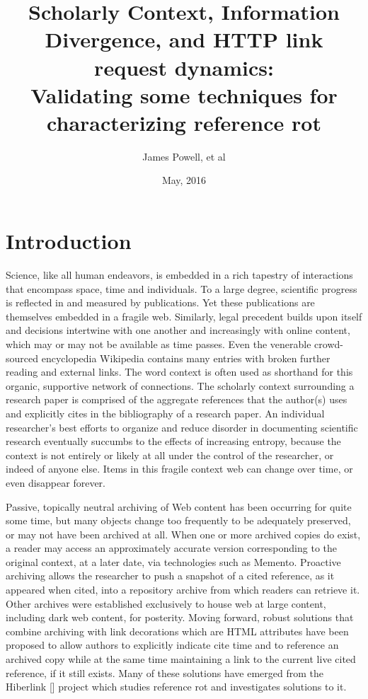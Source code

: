 \documentclass[12pt]{article}
\title{Scholarly Context, Information Divergence, and HTTP link request dynamics:\\
Validating some techniques for characterizing reference rot}
\date{May, 2016}
\author{James Powell, et al}
\begin{document}
\maketitle
\begin{abstract}
\end{abstract}
\section{Introduction}
Science, like all human endeavors, is embedded in a rich tapestry of interactions that encompass space, time and individuals. To a large degree, scientific progress is reflected in and measured by publications. Yet these publications are themselves embedded in a fragile web. Similarly, legal precedent builds upon itself and decisions intertwine with one another and increasingly with online content, which may or may not be available as time passes. Even the venerable crowd-sourced encyclopedia Wikipedia contains many entries with broken further reading and external links. The word context is often used as shorthand for this organic, supportive network of connections. The scholarly context surrounding a research paper is comprised of the aggregate references that the author(s) uses and explicitly cites in the bibliography of a research paper. An individual researcher's best efforts to organize and reduce disorder in documenting scientific research eventually succumbs to the effects of increasing entropy, because the context is not entirely or likely at all under the control of the researcher, or indeed of anyone else. Items in this fragile context web can change over time, or even disappear forever.

Passive, topically neutral archiving of Web content has been occurring for quite some time, but many objects change too frequently to be adequately preserved, or may not have been archived at all. When one or more archived copies do exist, a reader may access an approximately accurate version corresponding to the original context, at a later date, via technologies such as Memento. Proactive archiving allows the researcher to push a snapshot of a cited reference, as it appeared when cited, into a repository archive from which readers can retrieve it. Other archives were established exclusively to house web at large content, including dark web content, for posterity. Moving forward, robust solutions that combine archiving with link decorations which are HTML attributes have been proposed to allow authors to explicitly indicate cite time and to reference an archived copy while at the same time maintaining a link to the current live cited reference, if it still exists. Many of these solutions have emerged from the Hiberlink [] project which studies reference rot and investigates solutions to it. 
\end{document}
